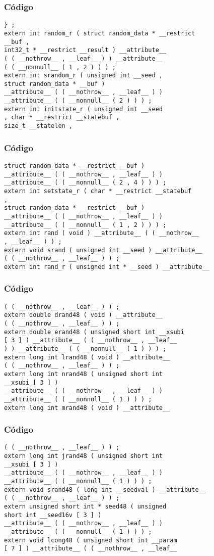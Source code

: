 \documentclass{beamer}
\begin{document}
\begin{frame}[fragile]
\frametitle{C\'odigo}
\begin{verbatim}
} ; 
extern int random_r ( struct random_data * __restrict 
__buf , 
int32_t * __restrict __result ) __attribute__ 
( ( __nothrow__ , __leaf__ ) ) __attribute__ 
( ( __nonnull__ ( 1 , 2 ) ) ) ; 
extern int srandom_r ( unsigned int __seed , 
struct random_data * __buf ) 
__attribute__ ( ( __nothrow__ , __leaf__ ) ) 
__attribute__ ( ( __nonnull__ ( 2 ) ) ) ; 
extern int initstate_r ( unsigned int __seed 
, char * __restrict __statebuf , 
size_t __statelen , 
\end{verbatim}
\end{frame}
\begin{frame}[fragile]
\frametitle{C\'odigo}
\begin{verbatim}
struct random_data * __restrict __buf ) 
__attribute__ ( ( __nothrow__ , __leaf__ ) ) 
__attribute__ ( ( __nonnull__ ( 2 , 4 ) ) ) ; 
extern int setstate_r ( char * __restrict __statebuf 
, 
struct random_data * __restrict __buf ) 
__attribute__ ( ( __nothrow__ , __leaf__ ) ) 
__attribute__ ( ( __nonnull__ ( 1 , 2 ) ) ) ; 
extern int rand ( void ) __attribute__ ( ( __nothrow__ 
, __leaf__ ) ) ; 
extern void srand ( unsigned int __seed ) __attribute__ 
( ( __nothrow__ , __leaf__ ) ) ; 
extern int rand_r ( unsigned int * __seed ) __attribute__ 
\end{verbatim}
\end{frame}
\begin{frame}[fragile]
\frametitle{C\'odigo}
\begin{verbatim}
( ( __nothrow__ , __leaf__ ) ) ; 
extern double drand48 ( void ) __attribute__ 
( ( __nothrow__ , __leaf__ ) ) ; 
extern double erand48 ( unsigned short int __xsubi 
[ 3 ] ) __attribute__ ( ( __nothrow__ , __leaf__ 
) ) __attribute__ ( ( __nonnull__ ( 1 ) ) ) ; 
extern long int lrand48 ( void ) __attribute__ 
( ( __nothrow__ , __leaf__ ) ) ; 
extern long int nrand48 ( unsigned short int 
__xsubi [ 3 ] ) 
__attribute__ ( ( __nothrow__ , __leaf__ ) ) 
__attribute__ ( ( __nonnull__ ( 1 ) ) ) ; 
extern long int mrand48 ( void ) __attribute__ 
\end{verbatim}
\end{frame}
\begin{frame}[fragile]
\frametitle{C\'odigo}
\begin{verbatim}
( ( __nothrow__ , __leaf__ ) ) ; 
extern long int jrand48 ( unsigned short int 
__xsubi [ 3 ] ) 
__attribute__ ( ( __nothrow__ , __leaf__ ) ) 
__attribute__ ( ( __nonnull__ ( 1 ) ) ) ; 
extern void srand48 ( long int __seedval ) __attribute__ 
( ( __nothrow__ , __leaf__ ) ) ; 
extern unsigned short int * seed48 ( unsigned 
short int __seed16v [ 3 ] ) 
__attribute__ ( ( __nothrow__ , __leaf__ ) ) 
__attribute__ ( ( __nonnull__ ( 1 ) ) ) ; 
extern void lcong48 ( unsigned short int __param 
[ 7 ] ) __attribute__ ( ( __nothrow__ , __leaf__ 
\end{verbatim}
\end{frame}
\end{document}
